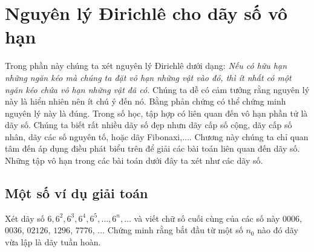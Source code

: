 
\section{Nguyên lý Đirichlê cho dãy số vô hạn}
\begin{center}
\textbf{\color{violet}{Nguyễn Hữu Điển (Hà Nội)}}
\end{center}	
\noindent Trong phần này chúng ta xét nguyên lý Đirichlê dưới dạng:
{\em{Nếu có hữu hạn những ngăn kéo mà chúng ta đặt vô hạn những vật vào đó, thì ít nhất có một ngăn kéo chứa vô hạn những vật đã có.}}
Chúng ta dễ có cảm tưởng rằng nguyên lý này là hiển nhiên nên ít chú ý đến nó. Bằng phản chứng có thể chứng minh nguyên lý này là đúng. Trong số học, tập hợp có liên quan đến vô hạn phần tử là dãy số. Chúng ta biết rất nhiều dãy số đẹp nhưn dãy cấp số cộng, dãy cấp số nhân, dãy các số nguyên tố, hoặc dãy Fibonaxi,$\ldots$. Chương này chúng ta chỉ quan tâm đến áp dụng điều phát biểu trên để giải các bài toán liên quan đến dãy số. Những tập vô hạn trong các bài toán dưới đây ta xét như các dãy số.

\subsection{Một số ví dụ giải toán}
\begin{vd}
Xét dãy số $6, 6^2, 6^3, 6^4, 6^5,\ldots,6^n,\ldots$ và viết chữ số cuối cùng của các số này $0006$, $0036$, $02126$, $1296$, $7776$, $\ldots$ Chứng minh rằng bắt đầu từ một số $n_0$ nào đó dãy vừa lập là dãy tuần hoàn.
\end{vd}

